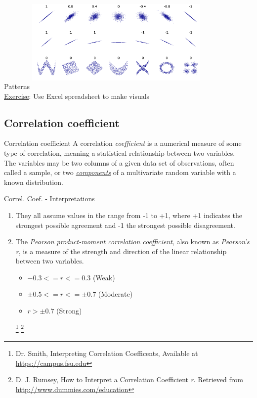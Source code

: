 \documentclass{beamer}
\begin{document}
\begin{frame}{Patterns}
\centering 
	\includegraphics[height=5cm, width=9cm]{cor_ex}\\ 
	\underline{Exercise}: Use Excel spreadsheet to make visuals
\end{frame}

\subsection{Correlation coefficient}

\begin{frame}{Correlation coefficient}
	\centering 
	A correlation \emph{coefficient} is a numerical measure of some type of correlation, meaning a statistical relationship between two variables. \\ 
	
	The variables may be two columns of a given data set of observations, often called a sample, or two \emph{\underline{components}} of a multivariate random variable with a known distribution.
\end{frame}

\begin{frame}{Correl. Coef. - Interpretations}

\begin{enumerate}
	\item They all assume values in the range from -1 to +1, where +1 indicates the strongest possible agreement and -1 the strongest possible disagreement.
	\item The \emph{Pearson product-moment correlation coefficient}, also known as \emph{Pearson's r}, is a measure of the strength and direction of the linear relationship between two variables. 
	\begin{itemize}
	\item $-0.3 <= r <= 0.3$ (Weak)
	\item $ \pm 0.5 <= r <= \pm 0.7$ (Moderate)
	\item $ r > \pm 0.7 $ (Strong)
	\end{itemize} \footnote{Dr. Smith, Interpreting Correlation Coefficents, Available at \url{https://campus.fsu.edu}} \footnote{D. J. Rumsey, How to Interpret a Correlation Coefficient \emph{r}. Retrieved from \url{http://www.dummies.com/education}}
	
\end{enumerate}
	
\end{frame}
\end{document}
